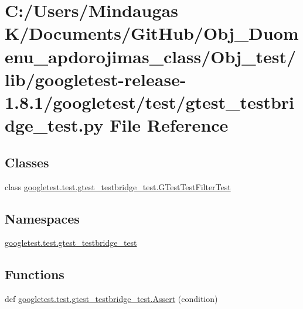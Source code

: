 \hypertarget{_obj__test_2lib_2googletest-release-1_88_81_2googletest_2test_2gtest__testbridge__test_8py}{}\section{C\+:/\+Users/\+Mindaugas K/\+Documents/\+Git\+Hub/\+Obj\+\_\+\+Duomenu\+\_\+apdorojimas\+\_\+class/\+Obj\+\_\+test/lib/googletest-\/release-\/1.8.1/googletest/test/gtest\+\_\+testbridge\+\_\+test.py File Reference}
\label{_obj__test_2lib_2googletest-release-1_88_81_2googletest_2test_2gtest__testbridge__test_8py}
\subsection*{Classes}
\begin{DoxyCompactItemize}
\item 
class \mbox{\hyperlink{classgoogletest_1_1test_1_1gtest__testbridge__test_1_1_g_test_test_filter_test}{googletest.\+test.\+gtest\+\_\+testbridge\+\_\+test.\+G\+Test\+Test\+Filter\+Test}}
\end{DoxyCompactItemize}
\subsection*{Namespaces}
\begin{DoxyCompactItemize}
\item 
 \mbox{\hyperlink{namespacegoogletest_1_1test_1_1gtest__testbridge__test}{googletest.\+test.\+gtest\+\_\+testbridge\+\_\+test}}
\end{DoxyCompactItemize}
\subsection*{Functions}
\begin{DoxyCompactItemize}
\item 
def \mbox{\hyperlink{namespacegoogletest_1_1test_1_1gtest__testbridge__test_a50b2fc33de061274aedcf8fc6bca4789}{googletest.\+test.\+gtest\+\_\+testbridge\+\_\+test.\+Assert}} (condition)
\end{DoxyCompactItemize}
